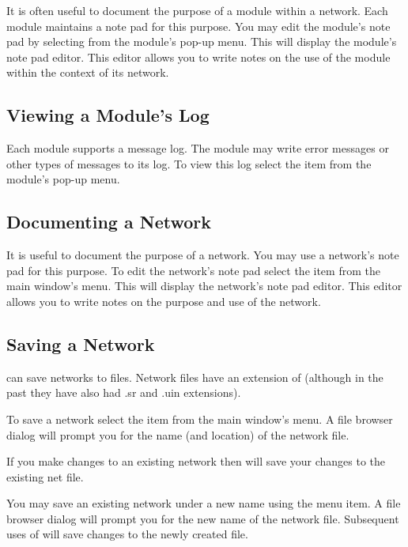 It is often useful to document the purpose of a module within a network.
Each module maintains a note pad for this purpose.  You may edit the
module's note pad by selecting  from the module's
pop-up menu.  This will display the module's note pad editor.  This 
editor allows you to write notes on the use of the
module within the context of its network.

\subsection{Viewing a Module's Log}
\label{sec:viewmodslog}

Each module supports a message log.  The module may write error messages or
other types of messages to its log.  To view this log select the
 item from the module's pop-up menu.

\subsection{Documenting a Network}
\label{sec:}

It is useful to document the purpose of a network.  You may use a network's
note pad for this purpose.  To edit the network's note pad select the
 item from the main window's  menu.  This
will display the network's note pad editor.  This editor allows you
to write notes on the purpose and use of the network.


\subsection{Saving a Network}
\label{sec:savenet}

\sr{} can save networks to files.  Network files have an extension of
 (although in the past they have also had .sr and .uin
extensions).  

To save a network select the  item from the main window's
 menu.  A file browser dialog will prompt you for the
name (and location) of the network file.

If you make changes to an existing network then  will
save your changes to the existing net file.

You may save an existing network under a new name using the
 menu item.  A file browser dialog will prompt
you for the new name of the network file.  Subsequent uses of
 will save changes to the newly created file.

